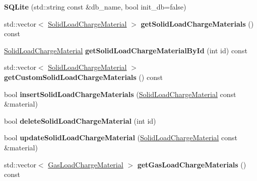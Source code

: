 \begin{DoxyCompactItemize}
\item 
\mbox{\label{class_s_q_lite_a758f334ed7e72820f4f0e83d2b707625}} 
{\bfseries S\+Q\+Lite} (std\+::string const \&db\+\_\+name, bool init\+\_\+db=false)
\item 
\mbox{\label{class_s_q_lite_a0c4fdc189a0da0d879c657b9fed5ef1b}} 
std\+::vector$<$ \hyperlink{class_solid_load_charge_material}{Solid\+Load\+Charge\+Material} $>$ {\bfseries get\+Solid\+Load\+Charge\+Materials} () const
\item 
\mbox{\label{class_s_q_lite_ab2a00b913321a96a4d7b700627195616}} 
\hyperlink{class_solid_load_charge_material}{Solid\+Load\+Charge\+Material} {\bfseries get\+Solid\+Load\+Charge\+Material\+By\+Id} (int id) const
\item 
\mbox{\label{class_s_q_lite_a74e20802e333acd20a86bfdc4013eba8}} 
std\+::vector$<$ \hyperlink{class_solid_load_charge_material}{Solid\+Load\+Charge\+Material} $>$ {\bfseries get\+Custom\+Solid\+Load\+Charge\+Materials} () const
\item 
\mbox{\label{class_s_q_lite_a5c40ac3b9a6abb85c9cfbe50802672c5}} 
bool {\bfseries insert\+Solid\+Load\+Charge\+Materials} (\hyperlink{class_solid_load_charge_material}{Solid\+Load\+Charge\+Material} const \&material)
\item 
\mbox{\label{class_s_q_lite_a0a240c89a1e0c96ef61c3beae68b1467}} 
bool {\bfseries delete\+Solid\+Load\+Charge\+Material} (int id)
\item 
\mbox{\label{class_s_q_lite_ac2c7142caa0154783f7ed73afa4bd6db}} 
bool {\bfseries update\+Solid\+Load\+Charge\+Material} (\hyperlink{class_solid_load_charge_material}{Solid\+Load\+Charge\+Material} const \&material)
\item 
\mbox{\label{class_s_q_lite_a173cb741ec36f8b15e3650f6e1736b12}} 
std\+::vector$<$ \hyperlink{class_gas_load_charge_material}{Gas\+Load\+Charge\+Material} $>$ {\bfseries get\+Gas\+Load\+Charge\+Materials} () const
\item 
\mbox{\label{class_s_q_lite_ab89ac4049cbedcb6340f5d7d0139b89e}} 

\end{DoxyCompactItemize}
